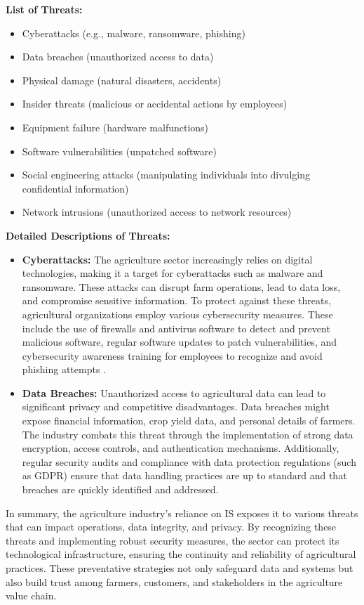 \documentclass[12pt,a4paper]{article}
\begin{document}
\textbf{List of Threats:}
\begin{itemize}
    \item Cyberattacks (e.g., malware, ransomware, phishing)
    \item Data breaches (unauthorized access to data)
    \item Physical damage (natural disasters, accidents)
    \item Insider threats (malicious or accidental actions by employees)
    \item Equipment failure (hardware malfunctions)
    \item Software vulnerabilities (unpatched software)
    \item Social engineering attacks (manipulating individuals into divulging confidential information)
    \item Network intrusions (unauthorized access to network resources)
\end{itemize}
\noindent\textbf{Detailed Descriptions of Threats:}
\begin{itemize}
    \item \textbf{Cyberattacks:} The agriculture sector increasingly relies on digital technologies, making it a target for cyberattacks such as malware and ransomware. These attacks can disrupt farm operations, lead to data loss, and compromise sensitive information. To protect against these threats, agricultural organizations employ various cybersecurity measures. These include the use of firewalls and antivirus software to detect and prevent malicious software, regular software updates to patch vulnerabilities, and cybersecurity awareness training for employees to recognize and avoid phishing attempts \citep{Ref_11}.
    \item \noindent\textbf{Data Breaches:} Unauthorized access to agricultural data can lead to significant privacy and competitive disadvantages. Data breaches might expose financial information, crop yield data, and personal details of farmers. The industry combats this threat through the implementation of strong data encryption, access controls, and authentication mechanisms. Additionally, regular security audits and compliance with data protection regulations (such as GDPR) ensure that data handling practices are up to standard and that breaches are quickly identified and addressed.
\end{itemize}

\noindent In summary, the agriculture industry's reliance on IS exposes it to various threats that can impact operations, data integrity, and privacy. By recognizing these threats and implementing robust security measures, the sector can protect its technological infrastructure, ensuring the continuity and reliability of agricultural practices. These preventative strategies not only safeguard data and systems but also build trust among farmers, customers, and stakeholders in the agriculture value chain.
\end{document}
